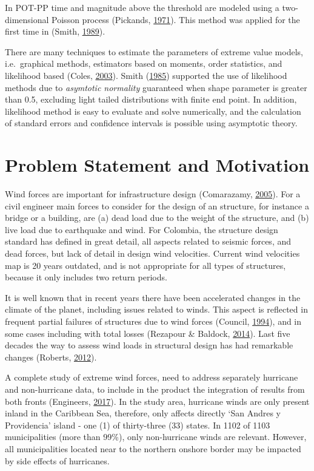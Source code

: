 \documentclass[12pt,oneside]{reedthesis}
\begin{document}
In POT-PP time and magnitude above the threshold are modeled using a two-dimensional Poisson process (Pickands, \protect\hyperlink{ref-Pickands1971}{1971}). This method was applied for the first time in (Smith, \protect\hyperlink{ref-Smith1989}{1989}).

There are many techniques to estimate the parameters of extreme value models, i.e.~graphical methods, estimators based on moments, order statistics, and likelihood based (Coles, \protect\hyperlink{ref-Coles2003}{2003}). Smith (\protect\hyperlink{ref-Smith1985}{1985}) supported the use of likelihood methods due to \emph{asymtotic normality} guaranteed when shape parameter is greater than 0.5, excluding light tailed distributions with finite end point. In addition, likelihood method is easy to evaluate and solve numerically, and the calculation of standard errors and confidence intervals is possible using asymptotic theory.

\hypertarget{problem-statement-and-motivation}{%
\section{Problem Statement and Motivation}\label{problem-statement-and-motivation}}

Wind forces are important for infrastructure design (Comarazamy, \protect\hyperlink{ref-windeffects}{2005}). For a civil engineer main forces to consider for the design of an structure, for instance a bridge or a building, are (a) dead load due to the weight of the structure, and (b) live load due to earthquake and wind. For Colombia, the structure design standard has defined in great detail, all aspects related to seismic forces, and dead forces, but lack of detail in design wind velocities. Current wind velocities map is 20 years outdated, and is not appropriate for all types of structures, because it only includes two return periods.

It is well known that in recent years there have been accelerated changes in the climate of the planet, including issues related to winds. This aspect is reflected in frequent partial failures of structures due to wind forces (Council, \protect\hyperlink{ref-winddamage}{1994}), and in some cases including with total losses (Rezapour \& Baldock, \protect\hyperlink{ref-Rezapour2014}{2014}). Last five decades the way to assess wind loads in structural design has had remarkable changes (Roberts, \protect\hyperlink{ref-Roberts2012}{2012}).

A complete study of extreme wind forces, need to address separately hurricane and non-hurricane data, to include in the product the integration of results from both fronts (Engineers, \protect\hyperlink{ref-Asce2017}{2017}). In the study area, hurricane winds are only present inland in the Caribbean Sea, therefore, only affects directly `San Andres y Providencia' island - one (1) of thirty-three (33) states. In 1102 of 1103 municipalities (more than 99\%), only non-hurricane winds are relevant. However, all municipalities located near to the northern onshore border may be impacted by side effects of hurricanes.
\end{document}
